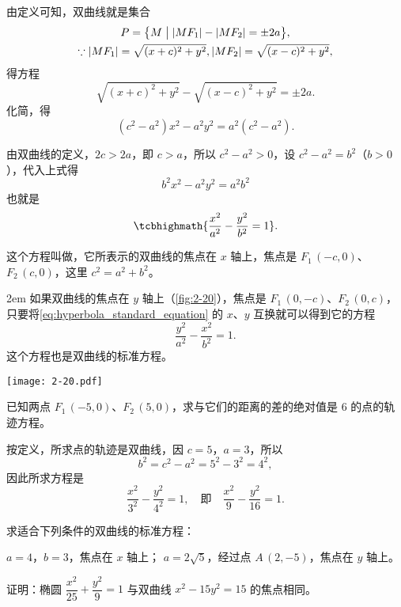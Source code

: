 \medskip
由定义可知，双曲线就是集合
\begin{gather*}
P=\bigl\{ M \bigm\vert |MF_1|-|MF_2|=\pm 2a \bigr\},\\
\because |MF_1|=\sqrt{(x+c)^2+y^2},|MF_2|=\sqrt{(x-c)^2+y^2},
\end{gather*}
得方程
\[ \sqrt{(x+c)^2+y^2}-\sqrt{(x-c)^2+y^2}=\pm 2a.\]
化简，得
\[(c^2-a^2)x^2-a^2y^2=a^2(c^2-a^2).\]

由双曲线的定义，$2c>2a$，即 $c>a$，所以 $c^2-a^2>0$，设 $c^2-a^2=b^2$（$b>0$），代入上式得
\[b^2x^2-a^2y^2=a^2b^2\]
也就是
\begin{equation}
  \label{eq:hyperbola_standard_equation}
  \tcbhighmath{\frac{x^2}{a^2}-\frac{y^2}{b^2}=1}.
\end{equation}

这个方程叫做，它所表示的双曲线的焦点在 $x$ 轴上，焦点是 $F_1\,(-c,0)$、$F_2\,(c,0)$，这里 $c^2=a^2+b^2$。

\medskip\noindent
\begin{minipage}{0.55\linewidth}\parindent2em
如果双曲线的焦点在 $y$ 轴上（\cref{fig:2-20}），焦点是 $F_1\,(0,-c)$、$F_2\,(0,c)$，只要将\cref{eq:hyperbola_standard_equation} 的 $x$、$y$ 互换就可以得到它的方程
\[ \frac{y^2}{a^2}-\frac{x^2}{b^2}=1. \]
这个方程也是双曲线的标准方程。
\end{minipage}\hfill
\begin{minipage}{0.4\linewidth}
\begin{figurehere}
  \texttt{[image: 2-20.pdf]}
  \caption{}\label{fig:2-20}
\end{figurehere}
\end{minipage}

\medskip
\begin{example}
  已知两点 $F_1\,(-5,0)$、$F_2\,(5,0)$，求与它们的距离的差的绝对值是 6 的点的轨迹方程。
\end{example}
\begin{solution}
  按定义，所求点的轨迹是双曲线，因 $c=5$，$a=3$，所以
  \[b^2=c^2-a^2=5^2-3^2=4^2,\]
  因此所求方程是
  \[ \frac{x^2}{3^2}-\frac{y^2}{4^2}=1,\quad\text{即}\quad \frac{x^2}{9}-\frac{y^2}{16}=1.\]
\end{solution}

\begin{Practice}
  \begin{question}
    \item 求适合下列条件的双曲线的标准方程：
    \begin{tasks}
      \task $a=4$，$b=3$，焦点在 $x$ 轴上；
      \task $a=2\sqrt{5}$，经过点 $A\,(2,-5)$，焦点在 $y$ 轴上。
    \end{tasks}
    \item 证明：椭圆 $\dfrac{x^2}{25}+\dfrac{y^2}{9}=1$ 与双曲线 $x^2-15y^2=15$ 的焦点相同。
  \end{question}
\end{Practice}

